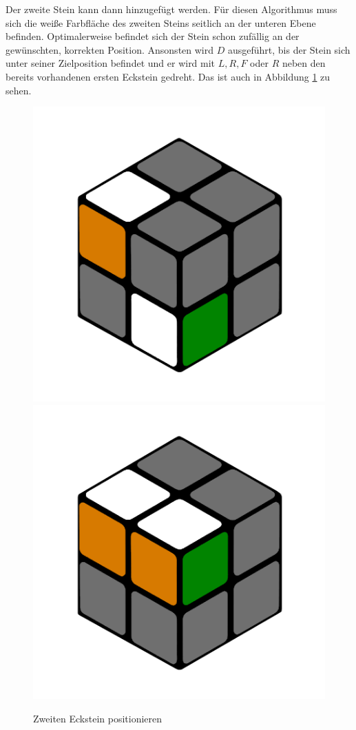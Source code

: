 \documentclass[12pt,a4paper, usenames, dvipsnames]{article}
\theoremstyle{mystyle}
\theoremstyle{definition}
\begin{document}
Der zweite Stein kann dann hinzugefügt werden.
Für diesen Algorithmus muss sich die weiße Farbfläche des zweiten Steins seitlich an der unteren Ebene befinden. Optimalerweise befindet sich der Stein schon zufällig an der gewünschten, korrekten Position.
Ansonsten wird $D$ ausgeführt, bis der Stein sich unter seiner Zielposition befindet und er wird mit $L, R, F$ oder $R$ neben den bereits vorhandenen ersten Eckstein gedreht. Das ist auch in Abbildung \ref{Abbildung_ZweiterEckstein} zu sehen.

\begin{figure}[H]
\centering
\includegraphics[scale=0.1]{e1_s2_s1.png}
\includegraphics[scale=0.1]{e1_s2_s2.png}
\caption{Zweiten Eckstein positionieren}
\label{Abbildung_ZweiterEckstein}
\end{figure}
\end{document}
